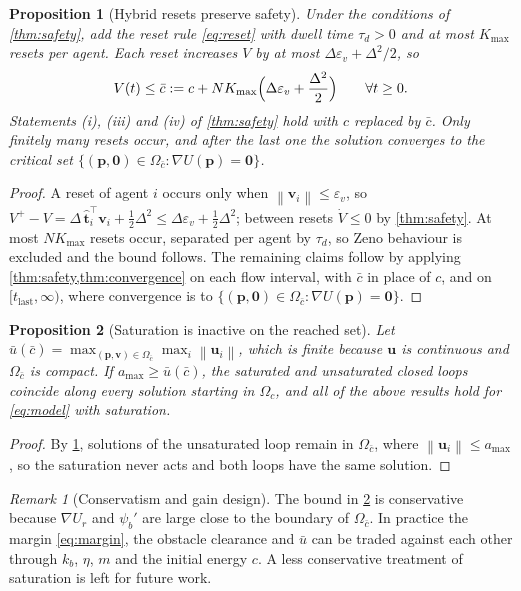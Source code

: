 \documentclass[11pt]{article}
\newtheorem{proposition}{Proposition}
\theoremstyle{definition}
\theoremstyle{remark}
\newtheorem{remark}{Remark}
\newcommand{\bp}{\mathbf{p}}
\newcommand{\bv}{\mathbf{v}}
\newcommand{\bu}{\mathbf{u}}
\newcommand{\bt}{\hat{\mathbf{t}}}
\newcommand{\norm}[1]{\left\lVert #1 \right\rVert}
\newcommand{\amax}{a_{\max}}
\begin{document}
\begin{proposition}[Hybrid resets preserve safety]\label{prop:hybrid}
Under the conditions of \cref{thm:safety}, add the reset rule \eqref{eq:reset}
with dwell time $\tau_d>0$ and at most $K_{\max}$ resets per agent. Each reset
increases $V$ by at most $\Delta\varepsilon_v+\Delta^2/2$, so
\begin{equation}
  V(t)\le\bar c:=c+N K_{\max}\Bigl(\Delta\varepsilon_v+\frac{\Delta^2}{2}\Bigr)\qquad\forall t\ge0 .
\end{equation}
Statements (i), (iii) and (iv) of \cref{thm:safety} hold with $c$ replaced by
$\bar c$. Only finitely many resets occur, and after the last one the solution
converges to the critical set $\{(\bp,\mathbf{0})\in\Omega_{\bar c}:\nabla U(\bp)=\mathbf{0}\}$.
\end{proposition}
\begin{proof}
A reset of agent $i$ occurs only when $\norm{\bv_i}\le\varepsilon_v$, so
$V^+-V=\Delta\,\bt_i^\top\bv_i+\tfrac12\Delta^2\le\Delta\varepsilon_v+\tfrac12\Delta^2$;
between resets $\dot V\le0$ by \cref{thm:safety}. At most $NK_{\max}$ resets
occur, separated per agent by $\tau_d$, so Zeno behaviour is excluded and the
bound follows. The remaining claims follow by applying
\cref{thm:safety,thm:convergence} on each flow interval, with $\bar c$ in place
of $c$, and on $[t_{\mathrm{last}},\infty)$, where convergence is to
$\{(\bp,\mathbf{0})\in\Omega_{\bar c}:\nabla U(\bp)=\mathbf{0}\}$.
\end{proof}

\begin{proposition}[Saturation is inactive on the reached set]\label{prop:sat}
Let $\bar u(\bar c)=\max_{(\bp,\bv)\in\Omega_{\bar c}}\max_i\norm{\bu_i}$,
which is finite because $\bu$ is continuous and $\Omega_{\bar c}$ is compact.
If $\amax\ge\bar u(\bar c)$, the saturated and unsaturated closed loops coincide
along every solution starting in $\Omega_{c}$, and all of the above results hold
for \eqref{eq:model} with saturation.
\end{proposition}
\begin{proof}
By \cref{prop:hybrid}, solutions of the unsaturated loop remain in
$\Omega_{\bar c}$, where $\norm{\bu_i}\le\amax$, so the saturation never
acts and both loops have the same solution.
\end{proof}

\begin{remark}[Conservatism and gain design]
The bound in \cref{prop:sat} is conservative because $\nabla U_r$ and
$\psi_b'$ are large close to the boundary of $\Omega_{\bar c}$. In practice the
margin \eqref{eq:margin}, the obstacle clearance and $\bar u$ can be traded
against each other through $k_b$, $\eta$, $m$ and the initial energy $c$. A
less conservative treatment of saturation is left for future work.
\end{remark}
\end{document}
